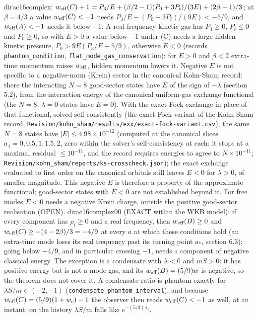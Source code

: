\documentclass[11pt]{article}
\begin{document}
dirac16complex: $w_{\rm eff}(C) + 1 = P_3/E + (\beta/2 - 1)(P_0 + 3P_t)/(3E) + (2\beta - 1)/3$; at $\beta = 4/3$ a value $w_{\rm eff}(C) < -1$ needs $P_3/E - (P_0 + 3P_t)/(9E) < -5/9$, and $w_{\rm eff}(A) < -1$ needs it below $-1$. A real-frequency kinetic gas has $P_3 \geq 0$, $P_t \leq 0$ and $P_0 \geq 0$, so with $E > 0$ a value below $-1$ under (C) needs a large hidden kinetic pressure, $P_0 > 9E(P_3/E + 5/9)$, otherwise $E < 0$ (records \texttt{phantom\_\allowbreak{}conditio\allowbreak{}n}, \texttt{flat\_mod\allowbreak{}e\_gas\_co\allowbreak{}nservati\allowbreak{}on}): for $E > 0$ and $\beta < 2$ extra-time momentum raises $w_{\rm eff}$, hidden momentum lowers it. Negative $E$ is not specific to a negative-norm (Krein) sector in the canonical Kohn-Sham record: there the interacting $N = 8$ good-sector states have $E$ of the sign of $-\lambda$ (section 5.2), from the interaction energy of the canonical uniform-gas exchange functional (the $N = 8$, $\lambda = 0$ states have $E = 0$). With the exact Fock exchange in place of that functional, solved self-consistently (the exact-Fock variant of the Kohn-Sham record, \texttt{Revision\allowbreak{}/kohn\_sh\allowbreak{}am/resul\allowbreak{}ts/exx/e\allowbreak{}xact-foc\allowbreak{}k-varian\allowbreak{}t.csv}), the same $N = 8$ states have $\lvert E\rvert \leq 4.98 \times 10^{-12}$ (computed at the canonical slices $a_4 = 0, 0.5, 1, 1.5, 2$, zero within the solver's self-consistency at each: it stops at a maximal residual $\leq 10^{-11}$, and the record requires energies to agree to $N \times 10^{-11}$; \texttt{Revision\allowbreak{}/kohn\_sh\allowbreak{}am/repor\allowbreak{}ts/ks-cr\allowbreak{}osscheck\allowbreak{}.json}); the exact exchange evaluated to first order on the canonical orbitals still leaves $E < 0$ for $\lambda > 0$, of smaller magnitude. This negative $E$ is therefore a property of the approximate functional; good-sector states with $E < 0$ are not established beyond it. For free modes $E < 0$ needs a negative Krein charge, outside the positive good-sector realisation (OPEN). dirac16complex00 (EXACT within the WKB model): if every component has $\rho_i \geq 0$ and a real frequency, then $w_{\rm eff}(B) \geq 0$ and $w_{\rm eff}(C) \geq -(4 - 2\beta)/3 = -4/9$ at every $a$ at which these conditions hold (an extra-time mode loses its real frequency past its turning point $a_*$, section 6.3); going below $-4/9$, and in particular crossing $-1$, needs a component of negative classical energy. The exception is a condensate with $\lambda < 0$ and $mS > 0$: it has positive energy but is not a mode gas, and its $w_{\rm eff}(B) = (5/9)w$ is negative, so the theorem does not cover it. A condensate ratio is phantom exactly for $\lambda S/m \in (-2, -1)$ (\texttt{condensa\allowbreak{}te\_phant\allowbreak{}om\_inter\allowbreak{}val}), and because $w_{\rm eff}(C) = (5/9)(1 + w_c) - 1$ the observer then reads $w_{\rm eff}(C) < -1$ as well, at an instant: on the history $\lambda S/m$ falls like $e^{-(5/3)a_4}$.
\end{document}
